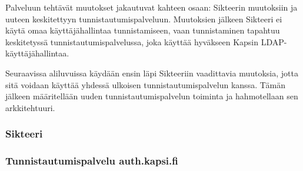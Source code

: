 Palveluun tehtävät muutokset jakautuvat kahteen osaan: Sikteerin muutoksiin ja uuteen keskitettyyn tunnistautumispalveluun. Muutoksien jälkeen Sikteeri ei käytä omaa käyttäjähallintaa tunnistamiseen, vaan tunnistaminen tapahtuu keskitetyssä tunnistautumispalvelussa, joka käyttää hyväkseen Kapsin LDAP-käyttäjähallintaa.

Seuraavissa aliluvuissa käydään ensin läpi Sikteeriin vaadittavia muutoksia, jotta sitä voidaan käyttää yhdessä ulkoisen tunnistautumispalvelun kanssa. Tämän jälkeen määritellään uuden tunnistautumispalvelun toiminta ja hahmotellaan sen arkkitehtuuri.

\subsubsection{Sikteeri}

\subsubsection{Tunnistautumispalvelu auth.kapsi.fi}
